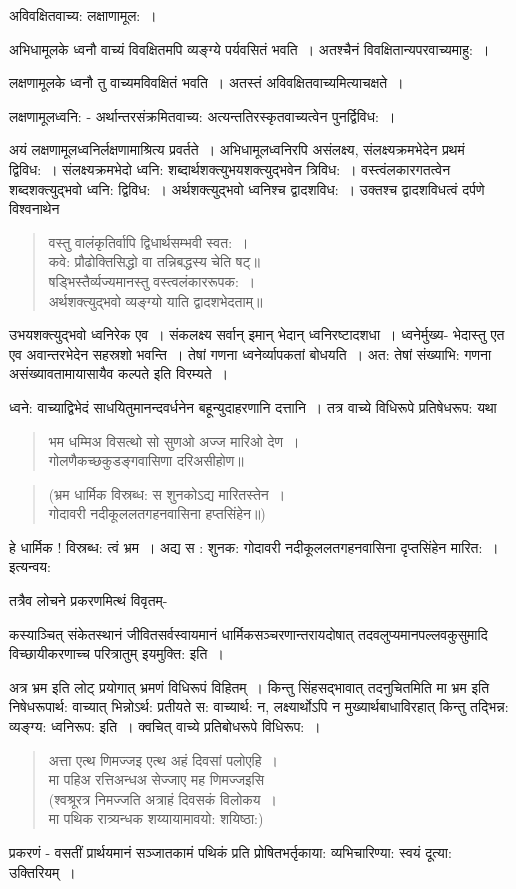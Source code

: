 {अविवक्षितवाच्य: लक्षाणामूल:~। 

अभिधामूलके ध्वनौ वाच्यं विवक्षितमपि व्यङ्ग्ये पर्यवसितं भवति~। अतश्चैनं विवक्षितान्यपरवाच्यमाहु:~। 

लक्षणामूलके ध्वनौ तु वाच्यमविवक्षितं भवति~। अतस्तं अविवक्षितवाच्यमित्याचक्षते~। 

लक्षणामूलध्वनि: - अर्थान्तरसंक्रमितवाच्य: अत्यन्ततिरस्कृतवाच्यत्वेन पुनर्द्विविध:~। 

अयं लक्षणामूलध्वनिर्लक्षणामाश्रित्य प्रवर्तते~। अभिधामूलध्वनिरपि असंलक्ष्य,  संलक्ष्यक्रमभेदेन प्रथमं द्विविध:~।  संलक्ष्यक्रमभेदो ध्वनि: शब्दार्थशक्त्युभयशक्त्युद्भवेन त्रिविध:~। वस्त्वंलकारगतत्वेन शब्दशक्त्युद्भवो ध्वनि: द्विविध:~। अर्थशक्त्युद्भवो ध्वनिश्च द्वादशविध:~। उक्तश्च द्वादशविधत्वं दर्पणे विश्वनाथेन

\begin{verse}
वस्तु वालंकृतिर्वापि द्विधार्थसम्भवी स्वत:~। \\
कवे: प्रौढोक्तिसिद्धो वा तन्निबद्धस्य चेति षट्॥\\
षड्भिस्तैर्व्यज्यमानस्तु वस्त्वलंकाररूपक:~। \\
अर्थशक्त्युद्भवो व्यङ्ग्यो याति द्वादशभेदताम्॥
\end{verse}
उभयशक्त्युद्भवो ध्वनिरेक एव~। संकलक्ष्य सर्वान् इमान् भेदान् ध्वनिरष्टादशधा~। ध्वनेर्मुख्य- भेदास्तु एत एव अवान्तरभेदेन सहस्रशो भवन्ति~। तेषां गणना ध्वनेर्व्यापकतां बोधयति~। अत: तेषां संख्याभि: गणना असंख्यावतामायासायैव कल्पते इति विरम्यते~। 

ध्वने: वाच्याद्विभेदं साधयितुमानन्दवर्धनेन बहून्युदाहरणानि दत्तानि~। तत्र वाच्ये विधिरूपे प्रतिषेधरूप: यथा 
\begin{verse}
भम धम्मिअ विसत्थो सो सुणओ अज्ज मारिओ देण~। \\
गोलणैकच्छकुडङ्गवासिणा दरिअसीहोण॥
\end{verse}
\begin{verse}
(भ्रम धार्मिक विस्रब्ध: स शुनकोऽद्य मारितस्तेन~। \\
गोदावरी नदीकूललतगहनवासिना हप्तसिंहेन॥)
\end{verse}
हे धार्मिक !  विस्रब्ध: त्वं भ्रम~। अद्य स : शुनक: गोदावरी नदीकूललतगहनवासिना दृप्तसिंहेन मारित:~। इत्यन्वय:

तत्रैव लोचने प्रकरणमित्थं विवृतम्-

कस्याञ्चित् संकेतस्थानं जीवितसर्वस्वायमानं धार्मिकसञ्चरणान्तरायदोषात् तदवलुप्यमानपल्लवकुसुमादि विच्छायीकरणाच्च परित्रातुम् इयमुक्ति: इति~। 

अत्र भ्रम इति लोट् प्रयोगात् भ्रमणं विधिरूपं विहितम्~। किन्तु सिंहसद्भावात् तदनुचितमिति मा भ्रम इति निषेधरूपार्थ: वाच्यात् भिन्नोऽर्थ: प्रतीयते स: वाच्यार्थ: न, लक्ष्यार्थोऽपि न मुख्यार्थबाधाविरहात् किन्तु तद्भिन्न: व्यङ्ग्य: ध्वनिरूप: इति~। क्वचित् वाच्ये प्रतिबोधरूपे विधिरूप:~। 
\begin{verse}
अत्ता एत्थ णिमज्जइ एत्थ अहं दिवसां पलोएहि~। \\
मा पहिअ रत्तिअन्धअ सेज्जाए मह णिमज्जइसि\\
(श्वश्रूरत्र निमज्जति अत्राहं दिवसकं विलोकय~। \\
मा पथिक रात्र्यन्धक शय्यायामावयो: शयिष्ठा:)
\end{verse}
प्रकरणं - वसतीं प्रार्थयमानं सञ्जातकामं पथिकं प्रति प्रोषितभर्तृकाया: व्यभिचारिण्या: स्वयं दूत्या: उक्तिरियम्~। 

}
